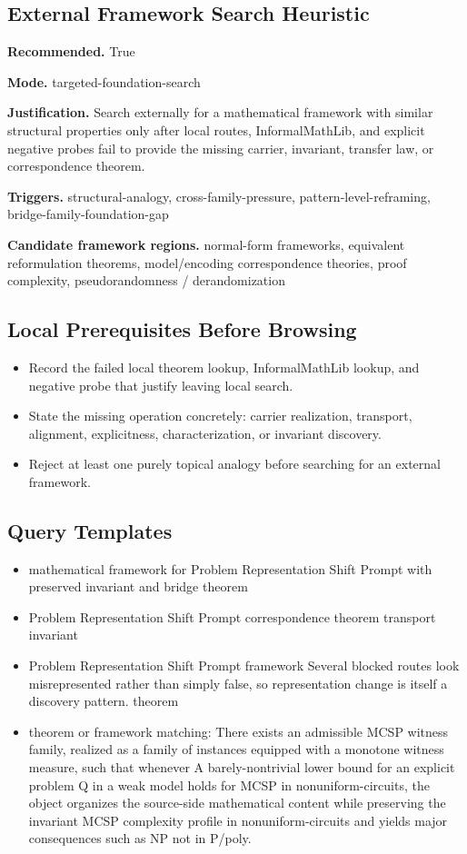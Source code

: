 \documentclass[11pt]{article}
\begin{document}
\subsection*{External Framework Search Heuristic}
\textbf{Recommended.} True

\textbf{Mode.} targeted-foundation-search

\textbf{Justification.} Search externally for a mathematical framework with similar structural properties only after local routes, InformalMathLib, and explicit negative probes fail to provide the missing carrier, invariant, transfer law, or correspondence theorem.

\textbf{Triggers.} structural-analogy, cross-family-pressure, pattern-level-reframing, bridge-family-foundation-gap

\textbf{Candidate framework regions.} normal-form frameworks, equivalent reformulation theorems, model/encoding correspondence theories, proof complexity, pseudorandomness / derandomization

\subsection*{Local Prerequisites Before Browsing}
\begin{itemize}[leftmargin=*,itemsep=0.2em]
\item Record the failed local theorem lookup, InformalMathLib lookup, and negative probe that justify leaving local search.
\item State the missing operation concretely: carrier realization, transport, alignment, explicitness, characterization, or invariant discovery.
\item Reject at least one purely topical analogy before searching for an external framework.
\end{itemize}
\subsection*{Query Templates}
\begin{itemize}[leftmargin=*,itemsep=0.2em]
\item mathematical framework for Problem Representation Shift Prompt with preserved invariant and bridge theorem
\item Problem Representation Shift Prompt correspondence theorem transport invariant
\item Problem Representation Shift Prompt framework Several blocked routes look misrepresented rather than simply false, so representation change is itself a discovery pattern. theorem
\item theorem or framework matching: There exists an admissible MCSP witness family, realized as a family of instances equipped with a monotone witness measure, such that whenever A barely-nontrivial lower bound for an explicit problem Q in a weak model holds for MCSP in nonuniform-circuits, the object organizes the source-side mathematical content while preserving the invariant MCSP complexity profile in nonuniform-circuits and yields major consequences such as NP not in P/poly.
\end{itemize}
\end{document}
